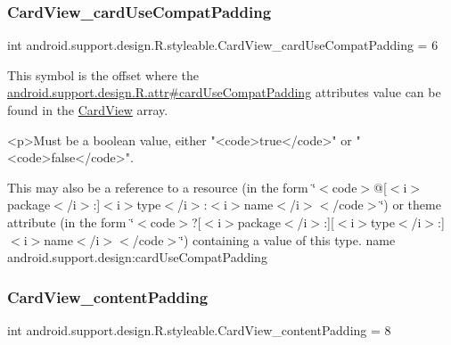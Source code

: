 \subsubsection{\texorpdfstring{Card\+View\+\_\+card\+Use\+Compat\+Padding}{CardView\_cardUseCompatPadding}}
{\footnotesize\ttfamily int android.\+support.\+design.\+R.\+styleable.\+Card\+View\+\_\+card\+Use\+Compat\+Padding = 6\hspace{0.3cm}{\ttfamily [static]}}

This symbol is the offset where the \hyperlink{classandroid_1_1support_1_1design_1_1R_1_1attr_a183c5ee389982503b56ef6304d75d768}{android.\+support.\+design.\+R.\+attr\#card\+Use\+Compat\+Padding} attribute\textquotesingle{}s value can be found in the \hyperlink{classandroid_1_1support_1_1design_1_1R_1_1styleable_a56025691fb136d28dc5fce5a25d7c65e}{Card\+View} array.

\begin{DoxyVerb}      <p>Must be a boolean value, either "<code>true</code>" or "<code>false</code>".
\end{DoxyVerb}
 

This may also be a reference to a resource (in the form \char`\"{}$<$code$>$@\mbox{[}$<$i$>$package$<$/i$>$\+:\mbox{]}$<$i$>$type$<$/i$>$\+:$<$i$>$name$<$/i$>$$<$/code$>$\char`\"{}) or theme attribute (in the form \char`\"{}$<$code$>$?\mbox{[}$<$i$>$package$<$/i$>$\+:\mbox{]}\mbox{[}$<$i$>$type$<$/i$>$\+:\mbox{]}$<$i$>$name$<$/i$>$$<$/code$>$\char`\"{}) containing a value of this type.  name android.\+support.\+design\+:card\+Use\+Compat\+Padding \mbox{\label{classandroid_1_1support_1_1design_1_1R_1_1styleable_a71511b509dca70524cb9582021ad44a8}} 
\subsubsection{\texorpdfstring{Card\+View\+\_\+content\+Padding}{CardView\_contentPadding}}
{\footnotesize\ttfamily int android.\+support.\+design.\+R.\+styleable.\+Card\+View\+\_\+content\+Padding = 8\hspace{0.3cm}{\ttfamily [static]}}

